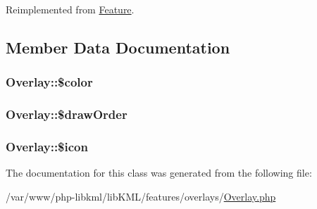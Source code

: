 Reimplemented from \hyperlink{classFeature_a3339c1d26a4ac98fd4b92112c508fcca}{Feature}.



\subsection{Member Data Documentation}
\hypertarget{classOverlay_a532fb4c7e06dada682bc0907df59b9c9}{
\subsubsection[{\$color}]{\setlength{\rightskip}{0pt plus 5cm}Overlay::\$color}}
\label{d3/d05/classOverlay_a532fb4c7e06dada682bc0907df59b9c9}
\hypertarget{classOverlay_ac28f33c36076ec5bd4f4726f4cafdbfa}{
\subsubsection[{\$drawOrder}]{\setlength{\rightskip}{0pt plus 5cm}Overlay::\$drawOrder}}
\label{d3/d05/classOverlay_ac28f33c36076ec5bd4f4726f4cafdbfa}
\hypertarget{classOverlay_a5540a8d829324b8123a1712dc4984952}{
\subsubsection[{\$icon}]{\setlength{\rightskip}{0pt plus 5cm}Overlay::\$icon}}
\label{d3/d05/classOverlay_a5540a8d829324b8123a1712dc4984952}


The documentation for this class was generated from the following file:\begin{DoxyCompactItemize}
\item 
/var/www/php-\/libkml/libKML/features/overlays/\hyperlink{Overlay_8php}{Overlay.php}\end{DoxyCompactItemize}
